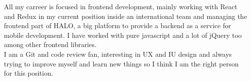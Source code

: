 \documentclass[11pt, a4paper]{awesome-cv} %
\begin{document}
\begin{cvletter}


All my carreer is focused in frontend development, mainly working with React and Redux in my current position inside an international team and managing the frontend part of HALO, a big platform to provide a backend as a service for mobile development.
I have worked with pure javascript and a lot of jQuery too among other frontend libraries.\\
I am a Git and code review fan, interesting in UX and IU design and always trying to improve myself and learn new things so I think I am the right person for this position.



\end{cvletter}


\makeletterclosing %
\end{document}
